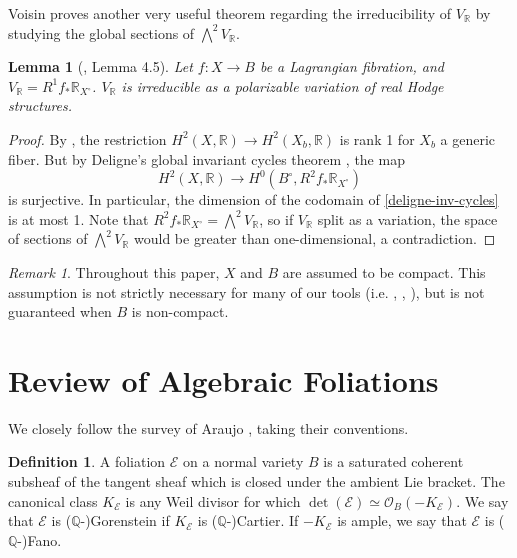 \documentclass[12pt]{amsart}
\newcommand{\R}{\mathbb{R}}
\newcommand{\Q}{\mathbb{Q}}
\newtheorem{lemma}[theorem]{Lemma}
\theoremstyle{definition}
\newtheorem{definition}[theorem]{Definition}
\theoremstyle{remark}
\newtheorem{remark}[theorem]{Remark}
\numberwithin{equation}{section}
\begin{document}
Voisin proves another very useful theorem regarding the irreducibility of \(V_\R\)
by studying the global sections of \(\bigwedge^2 V_\R\).

\begin{lemma}[\cite{vois18}, Lemma 4.5] \label{real-irreducibility}
    Let \(f: X \to B\) be a Lagrangian fibration, and \(V_\R = R^1 f_* \R_{X^\circ}\).
    $V_\R$ is irreducible as a polarizable variation of real Hodge structures.
\end{lemma}
\begin{proof}
    By \cite{mats16}, the restriction $H^2(X, \R) \to H^2(X_b, \R)$ is
    rank 1 for $X_b$ a generic fiber. But by Deligne's global invariant cycles theorem
    \cite{del71}, the map
    \begin{equation}
        \label{deligne-inv-cycles}
        H^2(X, \R) \to H^0(B^\circ, R^2 f_* \R_{X^\circ})
    \end{equation}
    is surjective. In particular, the dimension of the codomain of
    \eqref{deligne-inv-cycles} is at most 1. Note that
    $R^2 f_* \R_{X^\circ} = \bigwedge^2 V_\R$, so if $V_\R$ split as a variation,
    the space of sections of $\bigwedge^2 V_\R$ would be greater than one-dimensional,
    a contradiction.
\end{proof}

\begin{remark}
Throughout this paper, \(X\) and \(B\) are assumed to be compact. This assumption 
is not strictly necessary for many of our tools 
(i.e. , ,
), but  is not guaranteed when \(B\)
is non-compact. 
\end{remark}



\section{Review of Algebraic Foliations}

We closely follow the survey of Araujo \cite{araujo18}, taking their conventions.

\begin{definition}
    A foliation \(\mathcal{E}\) on a normal variety \(B\) is a saturated coherent
    subsheaf of the tangent sheaf which is closed under the ambient Lie bracket.
    The canonical class \(K_\mathcal{E}\) is any Weil divisor for which
    \(\det(\mathcal{E}) \simeq \mathcal{O}_B(-K_\mathcal{E})\).
    We say that \(\mathcal{E}\) is (\(\Q\)-)Gorenstein if \(K_\mathcal{E}\) is 
    (\(\Q\)-)Cartier. If \(-K_{\mathcal{E}}\) is ample, we say that \(\mathcal{E}\)
    is (\(\Q\)-)Fano.
\end{definition}
\end{document}
